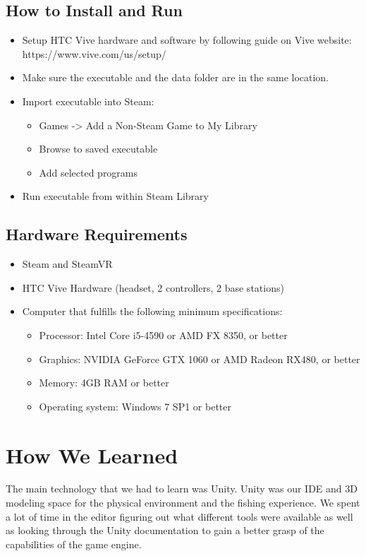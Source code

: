 \documentclass[10pt,journal,compsoc,onecolumn, draftclsnofoot]{IEEEtran}
\begin{document}
\subsection{How to Install and Run}
\begin{itemize}
  \item Setup HTC Vive hardware and software by following guide on Vive website: https://www.vive.com/us/setup/
  \item Make sure the executable and the data folder are in the same location.
  \item Import executable into Steam:
  \begin{itemize}
    \item Games -> Add a Non-Steam Game to My Library
    \item Browse to saved executable
    \item Add selected programs
  \end{itemize}
  \item Run executable from within Steam Library
\end{itemize}

\subsection{Hardware Requirements}
\begin{itemize}
  \item Steam and SteamVR
  \item HTC Vive Hardware (headset, 2 controllers, 2 base stations)
  \item Computer that fulfills the following minimum specifications:
  \begin{itemize}
    \item Processor: Intel Core i5-4590 or AMD FX 8350, or better
    \item Graphics: NVIDIA GeForce GTX 1060 or AMD Radeon RX480, or better
    \item Memory: 4GB RAM or better
    \item Operating system: Windows 7 SP1 or better
  \end{itemize}
\end{itemize}



\section{How We Learned}
The main technology that we had to learn was Unity. Unity was our IDE and 3D modeling space for the physical environment and the fishing experience. We spent a lot of time in the editor figuring out what different tools were available as well as looking through the Unity documentation to gain a better grasp of the capabilities of the game engine.
\end{document}
